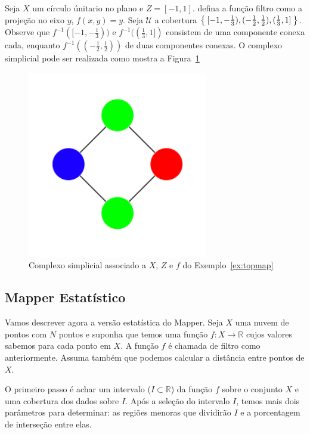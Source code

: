 \begin{ex}\label{ex:topmap}
    Seja $X$ um círculo únitario no plano e $Z=[-1,1]$. defina a função filtro como
    a projeção no eixo $y$, $f(x,y) = y$. Seja $\mathcal{U}$ a cobertura $\Set{[-1,-\frac{1}{3}), 
    (-\frac{1}{2},\frac{1}{2}), (\frac{1}{3}, 1]}$. Observe que $f^{-1}([-1,-\frac{1}{3}))$
    e $f^{-1}((\frac{1}{3}, 1])$  consistem de uma componente conexa cada, enquanto 
    $f^{-1}((-\frac{1}{2}, \frac{1}{2}))$ de duas componentes conexas. O complexo simplicial pode
    ser realizada como mostra a Figura~\ref{fig:topmap}
    \begin{figure}
        \centering
        \includegraphics[width=0.7\textwidth]{images/topmap.png}
        \caption{Complexo simplicial associado a $X$, $Z$ e $f$ 
                 do Exemplo~\ref{ex:topmap}}
        \label{fig:topmap}
    \end{figure}
\end{ex}

\subsection{Mapper Estatístico} 

Vamos descrever agora a versão estatística do Mapper. Seja $X$ uma nuvem de pontos com $N$ pontos
e suponha que temos uma função $f \colon X \to \mathbb{R}$ cujos valores sabemos para cada ponto
em $X$. A função $f$ é chamada de filtro como anteriormente. Assuma também que podemos calcular a 
distância entre pontos de $X$. 

O primeiro passo é achar um intervalo ($I \subset \mathbb{R}$) da função $f$ sobre o conjunto
$X$ e uma cobertura dos dados sobre $I$. Após a seleção do intervalo $I$, temos mais dois parâmetros 
para determinar: as regiões menoras que dividirão $I$ e a porcentagem de interseção entre elas. 

